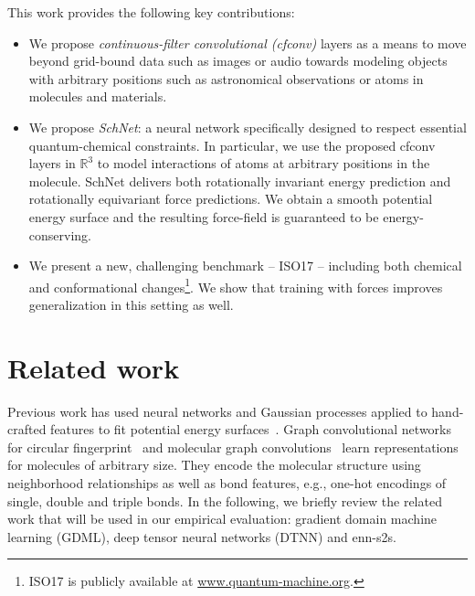 \documentclass{article}
\begin{document}
This work provides the following key contributions:
\begin{itemize}
\item We propose \emph{continuous-filter convolutional (cfconv)} layers as a means to move beyond grid-bound data such as images or audio towards modeling objects with arbitrary positions such as astronomical observations or atoms in molecules and materials.
\item We propose \emph{SchNet}: a neural network specifically designed to respect essential quantum-chemical constraints. 
In particular, we use the proposed cfconv layers in $\mathbb{R}^3$ to model interactions of atoms at arbitrary positions in the molecule.
SchNet delivers both rotationally invariant energy prediction and rotationally equivariant force predictions. 
We obtain a smooth potential energy surface and the resulting force-field is guaranteed to be energy-conserving.
\item We present a new, challenging benchmark -- ISO17 -- including both chemical and conformational changes\footnote{ISO17 is publicly available at \url{www.quantum-machine.org}.}.
We show that training with forces improves generalization in this setting as well.
\end{itemize}


\section{Related work}

Previous work has used neural networks and Gaussian processes applied to hand-crafted features to fit potential energy surfaces~\citep{manzhos2006random,malshe2009development,behler2007generalized,bartok2010gaussian,behler2011atom,bartok2013representing}.
Graph convolutional networks for circular fingerprint~\citep{duvenaud2015convolutional} and molecular graph convolutions~\citep{Kearnes2016} learn representations for molecules of arbitrary size.
They encode the molecular structure using neighborhood relationships as well as bond features, e.g., one-hot encodings of single, double and triple bonds.
In the following, we briefly review the related work that will be used in our empirical evaluation: gradient domain machine learning (GDML), deep tensor neural networks (DTNN) and enn-s2s.
\end{document}

